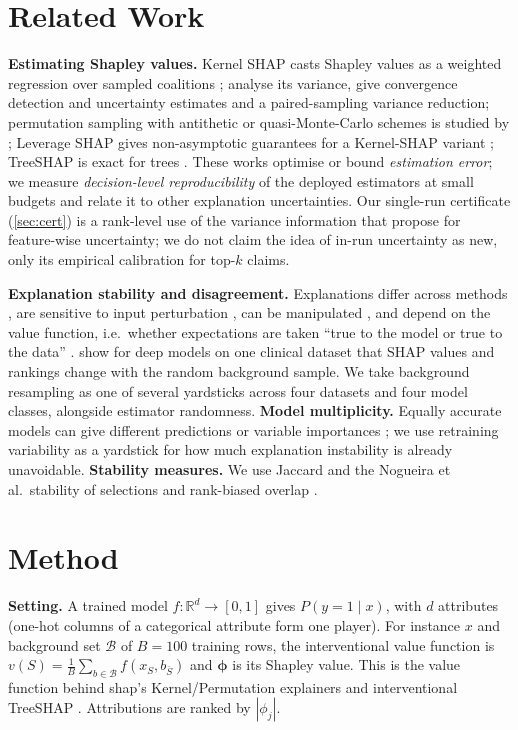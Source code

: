 \documentclass{article}
\newcommand{\phivec}{\boldsymbol\phi}
\begin{document}
\section{Related Work}
\textbf{Estimating Shapley values.} Kernel SHAP casts Shapley values as a weighted regression over sampled coalitions \citep{lundberg2017}; \citet{covert2021} analyse its variance, give convergence detection and uncertainty estimates and a paired-sampling variance reduction; permutation sampling with antithetic or quasi-Monte-Carlo schemes is studied by \citet{mitchell2022}; Leverage SHAP gives non-asymptotic guarantees for a Kernel-SHAP variant \citep{musco2024}; TreeSHAP is exact for trees \citep{lundberg2020trees}. These works optimise or bound \emph{estimation error}; we measure \emph{decision-level reproducibility} of the deployed estimators at small budgets and relate it to other explanation uncertainties. Our single-run certificate (\cref{sec:cert}) is a rank-level use of the variance information that \citet{covert2021} propose for feature-wise uncertainty; we do not claim the idea of in-run uncertainty as new, only its empirical calibration for top-$k$ claims.

\textbf{Explanation stability and disagreement.} Explanations differ across methods \citep{krishna2022}, are sensitive to input perturbation \citep{alvarezmelis2018,ghorbani2019}, can be manipulated \citep{slack2020}, and depend on the value function, i.e.\ whether expectations are taken ``true to the model or true to the data'' \citep{chen2020,janzing2020,kumar2020}. \citet{yuan2022} show for deep models on one clinical dataset that SHAP values and rankings change with the random background sample. We take background resampling as one of several yardsticks across four datasets and four model classes, alongside estimator randomness. \textbf{Model multiplicity.} Equally accurate models can give different predictions or variable importances \citep{marx2020,fisher2019}; we use retraining variability as a yardstick for how much explanation instability is already unavoidable. \textbf{Stability measures.} We use Jaccard and the Nogueira et al.\ stability of selections \citep{nogueira2018} and rank-biased overlap \citep{webber2010}.

\section{Method}\label{sec:method}
\textbf{Setting.} A trained model $f:\mathbb{R}^d\to[0,1]$ gives $P(y{=}1\mid x)$, with $d$ attributes (one-hot columns of a categorical attribute form one player). For instance $x$ and background set $\mathcal{B}$ of $B{=}100$ training rows, the interventional value function is $v(S)=\frac1B\sum_{b\in\mathcal B}f(x_S,b_{\bar S})$ and $\phivec$ is its Shapley value. This is the value function behind shap's Kernel/Permutation explainers and interventional TreeSHAP \citep{chen2020,lundberg2020trees}. Attributions are ranked by $|\phi_j|$.
\end{document}
